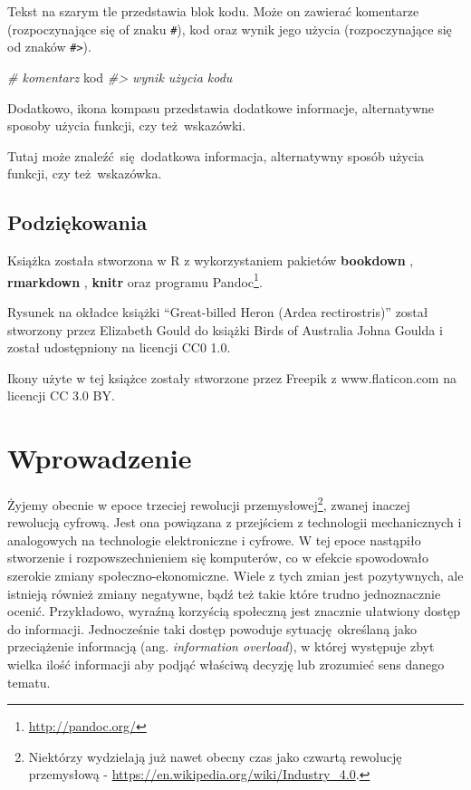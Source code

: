 \documentclass[paper=6in:9in,pagesize=pdftex,headinclude=on,footinclude=on,10pt]{scrbook}
\makeatletter
\newenvironment{Shaded}{\begin{snugshade}}{\end{snugshade}}
\newcommand{\CommentTok}[1]{\textcolor[rgb]{0.56,0.35,0.01}{\textit{#1}}}
\newcommand{\NormalTok}[1]{#1}
\DeclareRobustCommand{\href}[2]{#2\footnote{\url{#1}}}
\newenvironment{kframe}{%
\medskip{}
\setlength{\fboxsep}{.8em}
 \def\at@end@of@kframe{}%
 \ifinner\ifhmode%
  \def\at@end@of@kframe{\end{minipage}}%
  \begin{minipage}{\columnwidth}%
 \fi\fi%
 \def\FrameCommand##1{\hskip\@totalleftmargin \hskip-\fboxsep
 \colorbox{shadecolor}{##1}\hskip-\fboxsep
     \hskip-\linewidth \hskip-\@totalleftmargin \hskip\columnwidth}%
 \MakeFramed {\advance\hsize-\width
   \@totalleftmargin\z@ \linewidth\hsize
   \@setminipage}}%
 {\par\unskip\endMakeFramed%
 \at@end@of@kframe}
\newenvironment{rmdblock}[1]
  {
  \begin{itemize}
  \renewcommand{\labelitemi}{
    \raisebox{-.7\height}[0pt][0pt]{
      {\setkeys{Gin}{width=3em,keepaspectratio}\texttt{[image: images/\#1]}}
    }
  }
  \setlength{\fboxsep}{1em}
  \begin{kframe}
  \item
  }
  {
  \end{kframe}
  \end{itemize}
  }
\newenvironment{rmdinfo}
  {\begin{rmdblock}{compass}}
  {\end{rmdblock}}
\makeatother
\begin{document}
Tekst na szarym tle przedstawia blok kodu.
Może on zawierać komentarze (rozpoczynające się of znaku \texttt{\#}), kod oraz wynik jego użycia (rozpoczynające się od znaków \texttt{\#\textgreater{}}).

\begin{Shaded}
\begin{Highlighting}[]
\CommentTok{# komentarz}
\NormalTok{kod}
\CommentTok{#> wynik użycia kodu}
\end{Highlighting}
\end{Shaded}

Dodatkowo, ikona kompasu przedstawia dodatkowe informacje, alternatywne sposoby użycia funkcji, czy też~wskazówki.

\begin{rmdinfo}
Tutaj może znaleźć~się~dodatkowa informacja, alternatywny sposób użycia funkcji, czy też~wskazówka.
\end{rmdinfo}

\hypertarget{podziux119kowania}{%
\section*{Podziękowania}\label{podziux119kowania}}

Książka została stworzona w R \citep{R-base} z wykorzystaniem pakietów \textbf{bookdown} \citep{R-bookdown}, \textbf{rmarkdown} \citep{R-rmarkdown}, \textbf{knitr} \citep{R-knitr} oraz programu \href{http://pandoc.org/}{Pandoc}.

Rysunek na okładce książki ``Great-billed Heron (Ardea rectirostris)'' został stworzony przez Elizabeth Gould do książki Birds of Australia Johna Goulda i został udostępniony na licencji CC0 1.0.

Ikony użyte w tej książce zostały stworzone przez Freepik z www.flaticon.com na licencji CC 3.0 BY.

\hypertarget{wprowadzenie}{%
\chapter{Wprowadzenie}\label{wprowadzenie}}

Żyjemy obecnie w epoce trzeciej rewolucji przemysłowej\footnote{Niektórzy wydzielają już nawet obecny czas jako czwartą rewolucję przemysłową - \url{https://en.wikipedia.org/wiki/Industry_4.0}.}, zwanej inaczej rewolucją cyfrową.
Jest ona powiązana z przejściem z technologii mechanicznych i analogowych na technologie elektroniczne i cyfrowe.
W tej epoce nastąpiło stworzenie i rozpowszechnieniem się komputerów, co w efekcie spowodowało szerokie zmiany społeczno-ekonomiczne.
Wiele z tych zmian jest pozytywnych, ale istnieją również zmiany negatywne, bądź też takie które trudno jednoznacznie ocenić.
Przykładowo, wyraźną korzyścią społeczną jest znacznie ułatwiony dostęp do informacji.
Jednocześnie taki dostęp powoduje sytuację~określaną jako przeciążenie informacją (ang. \emph{information overload}), w której występuje zbyt wielka ilość informacji aby podjąć właściwą decyzję lub zrozumieć sens danego tematu.
\end{document}

